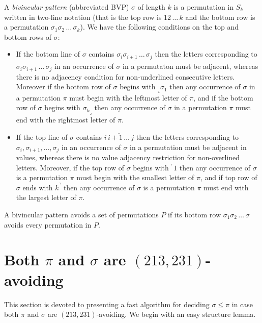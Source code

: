 \documentclass[a4paper]{llncs}
\begin{document}
A \emph{bivincular pattern} (abbreviated BVP) $\sigma$
of length $k$ is a permutation in $S_k$ written in
two-line notation 
(that is the top row is $12\,\ldots\,k$ and the bottom row
is a permutation $\sigma_1\sigma_2\,\ldots\,\sigma_k$).
We have the following conditions on the top and bottom rows
of $\sigma$:
\begin{itemize}
	\item
	If the bottom line of $\sigma$ contains
	$\underline{\sigma_i\sigma_{i+1}\,\ldots\,\sigma_j}$
	then the letters corresponding to 
	$\sigma_i\sigma_{i+1}\,\ldots\,\sigma_j$ in an occurrence of
	$\sigma$ in a permutaton must be adjacent, whereas there is
	no adjacency condition for
	non-underlined consecutive letters.
	Moreover if the bottom row of $\sigma$ begins with
	$_\llcorner{\sigma_1}$ then any occurrence of $\sigma$ 
	in a permutation $\pi$ must begin with the leftmost 
	letter of $\pi$,
	and 
	if the bottom row of $\sigma$ begins with
	${\sigma_k}_\lrcorner$ then any occurrence of $\sigma$ 
	in a permutation $\pi$ must end with the rightmost 
	letter of $\pi$.
	\item
	If the top line of $\sigma$ contains
	$\overline{i\,i+1\,\ldots\,j}$ then the letters corresponding to
	$\sigma_i, \sigma_{i+1}, \ldots, \sigma_j$ in an
	occurrence of $\sigma$ in a permutation must be adjacent in values,
	whereas there is no value adjacency restriction for non-overlined 
	letters.
	Moreover, if the top row of $\sigma$ begins with
	$^\ulcorner{1}$ then
	any occurrence of $\sigma$ is a permutation $\pi$ must begin with
	the smallest letter of $\pi$, and
	if top row of $\sigma$ ends with $k^\urcorner$ then
	any occurrence of $\sigma$ is a permutation $\pi$ must end with
	the largest letter of $\pi$.
\end{itemize}
A bivincular pattern avoids a set of permutations $P$ if its bottom
row $\sigma_1\sigma_2\,\ldots\,\sigma$ avoids every permutation in $P$.


\section{Both $\pi$ and $\sigma$ are $(213,231)$-avoiding}
\label{section:both are (231,213)-avoiding}

This section is devoted to presenting a fast algorithm for deciding
$\sigma \leq \pi$ 
in case both $\pi$ and $\sigma$ are $(213,231)$-avoiding.
We begin with an easy structure lemma.
\end{document}
